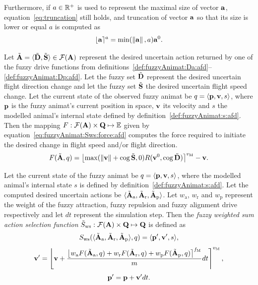 Furthermore, if $a \in \mathbb{R}^+$ is used to represent the maximal size of vector ${\mathbf{a}}$, equa\-ti\-on~\eqref{eq:truncation} still holds, and truncation of vector ${\mathbf{a}}$ so that its size is lower or equal $a$ is computed as
%
\begin{equation}
\lfloor{\ensuremath{\mathbf{a}}}\rceil^{a} = \min(\left\|{\mathbf{a}}\right\|, a) {\mathbf{a}}^0. \nonumber
\end{equation}

Let ${\tilde{{\mathbf{A}}}}=\langle {\ensuremath{\tilde{{\mathbf{D}}}}}, {\tilde{{\mathbf{S}}}} \rangle \in {\ensuremath{\mathcal{F}({\mathbf{A}})}}$ represent the desired uncertain action returned by one of the fuzzy drive functions from definitions~\ref{def:fuzzyAnimat:Da:afd}--\ref{def:fuzzyAnimat:Dp:afd}. Let the fuzzy set ${\tilde{{\mathbf{D}}}}$ represent the desired uncertain flight direction change and let the fuzzy set ${\tilde{{\mathbf{S}}}}$ the desired uncertain flight speed change. Let the current state of the observed fuzzy animat be $q=\langle {\ensuremath{\mathbf{p}}}, {\mathbf{v}}, s \rangle$, where ${\mathbf{p}}$ is the fuzzy animat's current position in space, ${\mathbf{v}}$ its velocity and $s$ the modelled animal's internal state defined by definition~\ref{def:fuzzyAnimat:s:afd}. Then the mapping $F: {\mathcal{F}({\mathbf{A}})} \times {\ensuremath{\mathbf{Q}}} \mapsto \mathbb{E}$ given by equation~\eqref{eq:fuzzyAnimat:Sws:force:afd} computes the force required to initiate the desired change in flight speed and/or flight direction.
\begin{equation}
F({\tilde{{\mathbf{A}}}},q)=\left\lfloor\max(\left\|{\mathbf{v}}\right\|+\operatorname*{cog}{\tilde{{\mathbf{S}}}},0)R({\mathbf{v}}^0,\operatorname*{cog}{\tilde{{\mathbf{D}}}})\right\rceil^{v_\mathrm{M}}-{\mathbf{v}}. \label{eq:fuzzyAnimat:Sws:force:afd}
\end{equation}

\begin{defn}
\label{def:fuzzyAnimat:Sws:afd}
Let the current state of the fuzzy animat be $q=\langle{\ensuremath{\mathbf{p}}},{\mathbf{v}},s\rangle$, where the modelled animal's internal state $s$ is defined by definition~\ref{def:fuzzyAnimat:s:afd}. Let the computed desired uncertain actions be $\langle {\ensuremath{\tilde{{\mathbf{A}}}}}_\mathrm{a},{\tilde{{\mathbf{A}}}}_\mathrm{r},{\tilde{{\mathbf{A}}}}_\mathrm{p}\rangle$. Let $w_\mathrm{a}$, $w_\mathrm{r}$ and $w_\mathrm{p}$ represent the weight of the fuzzy attraction, fuzzy repulsion and fuzzy alignment drive respectively and let $dt$ represent the simulation step. Then the \emph{fuzzy weighted sum action selection function} ${\tilde{S}}_\mathrm{ws}: {\mathcal{F}({\mathbf{A}})} \times {\ensuremath{\mathbf{Q}}} \mapsto {\ensuremath{\mathbf{Q}}}$ is defined as
\begin{equation}
S_\mathrm{ws}(\langle {\ensuremath{\tilde{{\mathbf{A}}}}}_\mathrm{a},{\tilde{{\mathbf{A}}}}_\mathrm{r},{\tilde{{\mathbf{A}}}}_\mathrm{p}\rangle, q) = \langle{\ensuremath{\mathbf{p}}}', {\mathbf{v}}', s\rangle, \label{eq:fuzzyAnimat:Sws0:afd}
\end{equation}
\begin{equation}
{\ensuremath{\mathbf{v}}}' = \left\lfloor {{\ensuremath{\mathbf{v}}} + \frac{\left\lfloor w_\mathrm{a}F({\ensuremath{\tilde{{\mathbf{A}}}}}_\mathrm{a},q) + w_\mathrm{r}F({\ensuremath{\tilde{{\mathbf{A}}}}}_\mathrm{r},q) + w_\mathrm{p}F({\ensuremath{\tilde{{\mathbf{A}}}}}_\mathrm{p},q) \right\rceil^{f_\mathrm{M}}}{m}}dt \right\rceil^{v_\mathrm{M}},
\end{equation}
\begin{equation}
{\ensuremath{\mathbf{p}}}' = {\mathbf{p}} + {\mathbf{v}}'dt. \label{eq:fuzzyAnimat:Sws2:afd}
\end{equation}
\end{defn}
 
